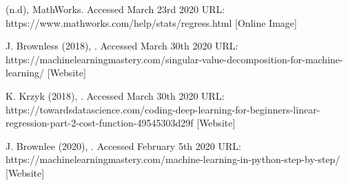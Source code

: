 \documentclass[a4paper, 12pt]{article}
\begin{document}
\begin{thebibliography}{99}
 (n.d), MathWorks. Accessed March 23rd 2020 URL: https://www.mathworks.com/help/stats/regress.html [Online Image]

J. Brownless (2018),
. Accessed March 30th 2020 URL: https://machinelearningmastery.com/singular-value-decomposition-for-machine-learning/ [Website]

K. Krzyk (2018),
. Accessed March 30th 2020 URL: https://towardsdatascience.com/coding-deep-learning-for-beginners-linear-regression-part-2-cost-function-49545303d29f [Website]

J. Brownlee (2020),
. Accessed February 5th 2020 URL: https://machinelearningmastery.com/machine-learning-in-python-step-by-step/ [Website]


\end{thebibliography}
\end{document}
